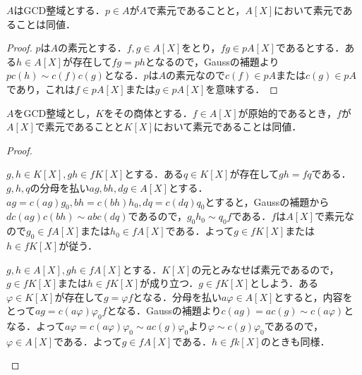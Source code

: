 %

\begin{prop}
	$A$はGCD整域とする．$p\in A$が$A$で素元であることと，$A[X]$において素元であることは同値．
\end{prop}

\begin{proof}
	$p$は$A$の素元とする．$f,g\in A[X]$をとり，$fg\in pA[X]$であるとする．ある$h\in A[X]$が存在して$fg=ph$となるので，Gaussの補題より$pc(h)\sim c(f)c(g)$となる．$p$は$A$の素元なので$c(f)\in pA$または$c(g)\in pA$であり，これは$f\in pA[X]$または$g\in pA[X]$を意味する．
\end{proof}

\begin{lem}
	$A$をGCD整域とし，$K$をその商体とする．$f\in A[X]$が原始的であるとき，$f$が$A[X]$で素元であることと$K[X]$において素元であることは同値．
\end{lem}
\begin{proof}
	\begin{eqv}
		\item $g,h\in K[X], gh\in fK[X]$とする．ある$q\in K[X]$が存在して$gh=fq$である．$g,h,q$の分母を払い$ag,bh,dg\in A[X]$とする．$ag=c(ag)g_0,bh=c(bh)h_0,dq=c(dq)q_0$とすると，Gaussの補題から$d c(ag)c(bh)\sim ab c(dq)$であるので，$g_0h_0\sim q_0f$である．$f$は$A[X]$で素元なので$g_0\in fA[X]$または$h_0\in fA[X]$である．よって$g\in fK[X]$または$h\in fK[X]$が従う．
		
		\item $g,h\in A[X], gh\in fA[X]$とする．$K[X]$の元とみなせば素元であるので，$g\in fK[X]$または$h\in fK[X]$が成り立つ．$g\in fK[X]$としよう．ある$\varphi\in K[X]$が存在して$g=\varphi f$となる．分母を払い$a\varphi\in A[X]$とすると，内容をとって$ag=c(a\varphi)\varphi_0f$となる．Gaussの補題より$c(ag)=ac(g)\sim c(a\varphi)$となる．よって$a\varphi=c(a\varphi)\varphi_0\sim ac(g)\varphi_0$より$\varphi\sim c(g)\varphi_0$であるので，$\varphi\in A[X]$である．よって$g\in fA[X]$である．$h\in fk[X]$のときも同様．
	\end{eqv}
\end{proof}

